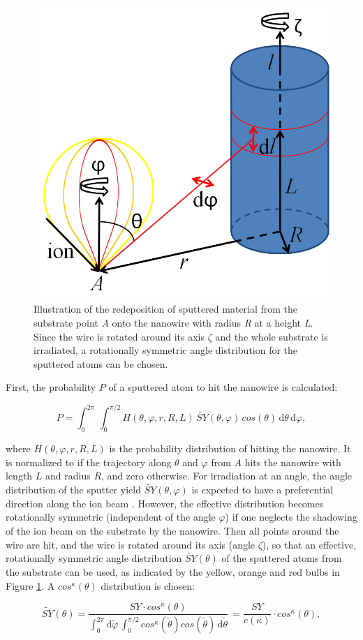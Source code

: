 \begin{figure}
	\centering
		\includegraphics[width=.4\textwidth]{images/redeposit.jpg}
	\caption{Illustration of the redeposition of sputtered material from the substrate point \emph{A} onto the nanowire with radius \emph{R} at a height \emph{L}. Since the wire is rotated around its axis $\zeta$ and the whole substrate is irradiated, a rotationally symmetric angle distribution for the sputtered atoms can be chosen.} 
	\label{redeposit}
\end{figure}

First, the probability $P$ of a sputtered atom to hit the nanowire is calculated:

\begin{equation}
\label{prob1}
P = \int_0^{2\pi} \! \,\int_0^{\pi/2} \!\! H(\theta,\varphi,r,R,L) \, \tilde{SY}(\theta,\varphi) \,cos(\theta)\,\mathrm{d}\theta \, \mathrm{d}\varphi,
\end{equation}

where $H(\theta,\varphi,r,R,L)$ is the probability distribution of hitting the nanowire. It is normalized to  if the trajectory along $\theta$ and $\varphi$ from $A$ hits the nanowire with length $L$ and radius $R$, and zero otherwise. For irradiation at an angle, the angle distribution of the sputter yield $\tilde{SY}(\theta,\varphi)$ is expected to have a preferential direction along the ion beam \cite{verdeil_angular_2008}. However, the effective distribution becomes rotationally symmetric (independent of the angle $\varphi$) if one neglects the shadowing of the ion beam on the substrate by the nanowire. Then all points around the wire are hit, and the wire is rotated around its axis (angle $\zeta$), so that an effective, rotationally symmetric angle distribution $\tilde{SY}(\theta)$ of the sputtered atoms from the substrate can be used, as indicated by the yellow, orange and red bulbs in Figure \ref{redeposit}. A $cos^\kappa(\theta)$ distribution is chosen: 

\begin{equation}
\tilde{SY}(\theta) = \frac{SY \cdot cos^\kappa(\theta)}{\int_0^{2\pi} \! \mathrm{d}\tilde\varphi \,\int_0^{\pi/2} \! cos^\kappa(\tilde\theta) cos(\tilde\theta)\,  \mathrm{d}\tilde\theta} \, = \frac{SY}{c(\kappa)} \cdot cos^\kappa(\theta) ,
\end{equation}

